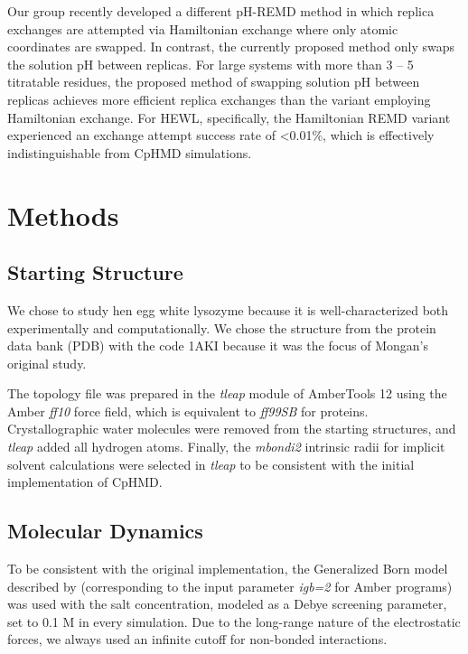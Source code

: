 Our group recently developed a different pH-REMD method in which replica
exchanges are attempted via Hamiltonian exchange where only atomic coordinates
are swapped. \cite{SabriDashti2012} In contrast, the currently proposed method
only swaps the solution pH between replicas. For large systems with more than 3
-- 5 titratable residues, the proposed method of swapping solution pH between
replicas achieves more efficient replica exchanges than the variant employing
Hamiltonian exchange. For HEWL, specifically, the Hamiltonian REMD variant
experienced an exchange attempt success rate of <0.01\%, which is effectively
indistinguishable from CpHMD simulations.

\section{Methods}

\subsection{Starting Structure}

We chose to study hen egg white lysozyme because it is well-characterized both
experimentally \cite{Takahashi1992, Bartik1994, Webb2011} and computationally.
\cite{Mongan2004,Demchuk1996,Wallace2011} We chose the structure from the
protein data bank (PDB) with the code 1AKI \cite{Artymiuk1982} because it was
the focus of Mongan's original study. \cite{Mongan2004}

The topology file was prepared in the \emph{tleap} module of AmberTools 12 using
the Amber \emph{ff10} force field, which is equivalent to \emph{ff99SB}
\cite{Hornak2006} for proteins. Crystallographic water molecules were removed
from the starting structures, and \emph{tleap} added all hydrogen atoms.
Finally, the \emph{mbondi2} intrinsic radii for implicit solvent calculations
were selected in \emph{tleap} to be consistent with the initial implementation
of CpHMD. \cite{Mongan2004}

\subsection{Molecular Dynamics}

To be consistent with the original implementation, the Generalized Born model
described by \citeauthor{Onufriev2004} \cite{Onufriev2004} (corresponding to the
input parameter \emph{igb=2} for Amber programs) was used with the salt
concentration, modeled as a Debye screening parameter, set to 0.1 M in every
simulation. \cite{Mongan2004} Due to the long-range nature of the
electrostatic forces, we always used an infinite cutoff for non-bonded
interactions.

